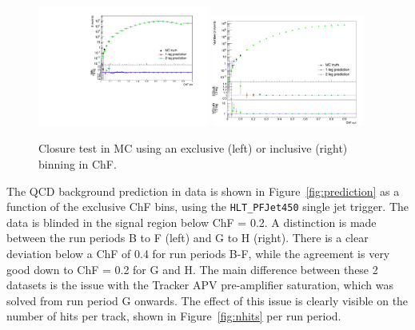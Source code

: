 \begin{figure}[h!]
  \includegraphics[width=0.5\textwidth]{figures/closure_test_QCD_exclusive_filters.pdf}\hspace{.2cm}%
  \includegraphics[width=0.45\textwidth]{figures/closure_test_QCD_filters.png}\hfill
  \caption{Closure test in MC using an exclusive (left) or inclusive (right) binning in ChF.}
  \label{fig:closuretest}
\end{figure}

The QCD background prediction in data is shown in Figure~\ref{fig:prediction} as a function of the exclusive ChF bins, using the \texttt{HLT\_PFJet450} single jet trigger. The data is blinded in the signal region below ChF = 0.2. A distinction is made between the run periods B to F (left) and G to H (right). There is a clear deviation below a ChF of 0.4 for run periods B-F, while the agreement is very good down to ChF = 0.2 for G and H. The main difference between these 2 datasets is the issue with the Tracker APV pre-amplifier saturation, which was solved from run period G onwards. The effect of this issue is clearly visible on the number of hits per track, shown in Figure~\ref{fig:nhits} per run period. 

